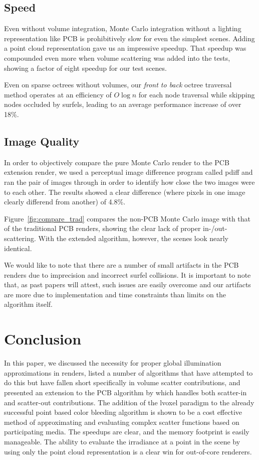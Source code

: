 \documentclass[12pt]{ucthesis}
\begin{document}
\subsection{Speed}
Even without volume integration, Monte Carlo integration without a lighting representation like PCB is prohibitively slow for even the simplest scenes.  Adding a point cloud representation gave us an impressive speedup.  That speedup was compounded even more when volume scattering was added into the tests, showing a factor of eight speedup for our test scenes.

Even on sparse octrees without volumes, our \textit{front to back} octree traversal method operates at an efficiency of $O\log{n}$ for each node traversal while skipping nodes occluded by surfels, leading to an average performance increase of over 18\%.

\subsection*{Image Quality}
In order to objectively compare the pure Monte Carlo render to the PCB extension render, we used a perceptual image difference program called pdiff and ran the pair of images through in order to identify how close the two images were to each other.  The results showed a clear difference (where pixels in one image clearly differend from another) of 4.8\%.

Figure~\ref{fig:compare_trad} compares the non-PCB Monte Carlo image with that of the traditional PCB renders, showing the clear lack of proper in-/out-scattering.  With the extended algorithm, however, the scenes look nearly identical.

We would like to note that there are a number of small artifacts in the PCB renders due to imprecision and incorrect surfel collisions.  It is important to note that, as past papers will attest, such issues are easily overcome and our artifacts are more due to implementation and time constraints than limits on the algorithm itself.

\section{Conclusion}

In this paper, we discussed the necessity for proper global illumination approximations in renders, listed a number of algorithms that have attempted to do this but have fallen short specifically in volume scatter contributions, and presented an extension to the PCB algorithm by \cite{christensen:2008} which handles both scatter-in and scatter-out contributions.  The addition of the lvoxel paradigm to the already successful point based color bleeding algorithm is shown to be a cost effective method of approximating and evaluating complex scatter functions based on participating media.  The speedups are clear, and the memory footprint is easily manageable.  The ability to evaluate the irradiance at a point in the scene by using only the point cloud representation is a clear win for out-of-core renderers.
\end{document}

